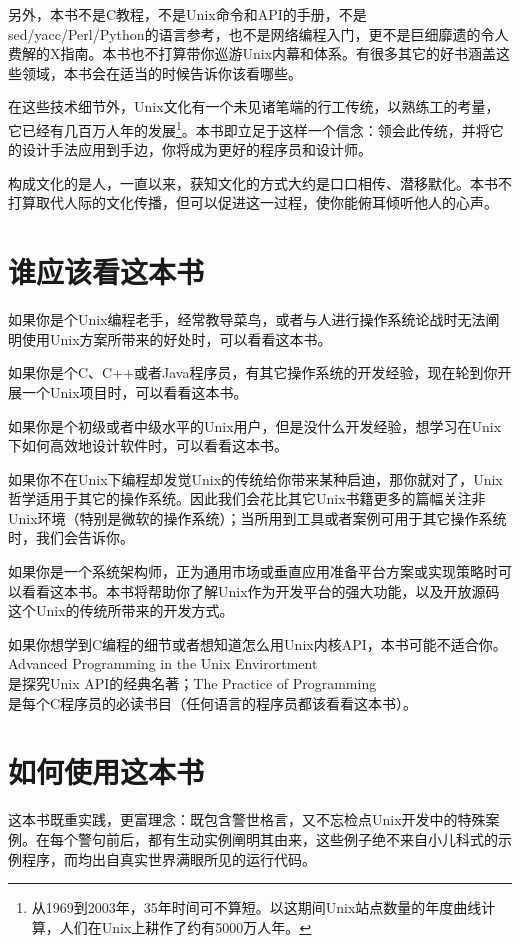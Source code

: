 \documentclass[12pt,oneside]{book}
\begin{document}
另外，本书不是C教程，不是Unix命令和API的手册，不是\\ sed/yacc/Perl/Python的语言参考，也不是网络编程入门，更不是巨细靡遗的令人费解的X指南。本书也不打算带你巡游Unix内幕和体系。有很多其它的好书涵盖这些领域，本书会在适当的时候告诉你该看哪些。

在这些技术细节外，Unix文化有一个未见诸笔端的行工传统，以熟练工的考量，它已经有几百万人年的发展\footnote{从1969到2003年，35年时间可不算短。以这期间Unix站点数量的年度曲线计算，人们在Unix上耕作了约有5000万人年。}。本书即立足于这样一个信念：领会此传统，并将它的设计手法应用到手边，你将成为更好的程序员和设计师。

构成文化的是人，一直以来，获知文化的方式大约是口口相传、潜移默化。本书不打算取代人际的文化传播，但可以促进这一过程，使你能俯耳倾听他人的心声。


\section{谁应该看这本书}
如果你是个Unix编程老手，经常教导菜鸟，或者与人进行操作系统论战时无法阐明使用Unix方案所带来的好处时，可以看看这本书。

如果你是个C、C++或者Java程序员，有其它操作系统的开发经验，现在轮到你开展一个Unix项目时，可以看看这本书。

如果你是个初级或者中级水平的Unix用户，但是没什么开发经验，想学习在Unix下如何高效地设计软件时，可以看看这本书。

如果你不在Unix下编程却发觉Unix的传统给你带来某种启迪，那你就对了，Unix哲学适用于其它的操作系统。因此我们会花比其它Unix书籍更多的篇幅关注非Unix环境（特别是微软的操作系统）；当所用到工具或者案例可用于其它操作系统时，我们会告诉你。

如果你是一个系统架构师，正为通用市场或垂直应用准备平台方案或实现策略时可以看看这本书。本书将帮助你了解Unix作为开发平台的强大功能，以及开放源码这个Unix的传统所带来的开发方式。

如果你想学到C编程的细节或者想知道怎么用Unix内核API，本书可能不适合你。Advanced Programming in the Unix Envirortment \\ \cite{Stevens92}是探究Unix API的经典名著；The Practice of Programming \\ \cite{Kernighan-Pike99}是每个C程序员的必读书目（任何语言的程序员都该看看这本书）。

\section{如何使用这本书}
这本书既重实践，更富理念：既包含警世格言，又不忘检点Unix开发中的特殊案例。在每个警句前后，都有生动实例阐明其由来，这些例子绝不来自小儿科式的示例程序，而均出自真实世界满眼所见的运行代码。
\end{document}
